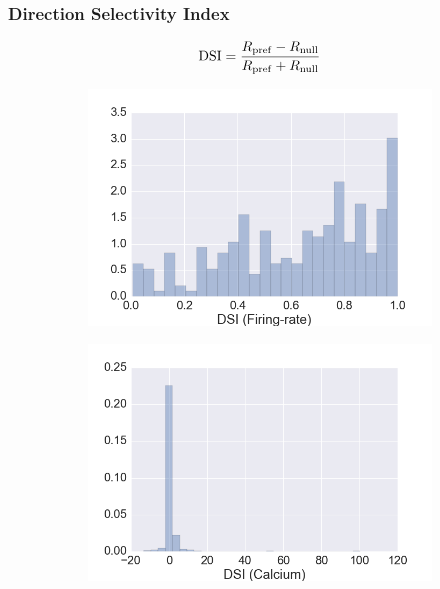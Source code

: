 \documentclass[10pt,mathserif]{beamer}
\begin{document}
\begin{frame}
\frametitle{\bf Direction Selectivity Index}
\begin{gather*}
{\rm DSI} = \frac{R_{\rm pref} - R_{\rm null}}{R_{\rm pref} + R_{\rm null}}
\end{gather*}
\begin{figure}
 \begin{subfigure}{0.45\textwidth}
\centering    
\includegraphics[scale=0.25]{DSI(Firing_rate).png}
 \end{subfigure}
 \begin{subfigure}{0.45\textwidth}
\centering    
\includegraphics[scale=0.25]{DSI(Calcium).png}
            
 \end{subfigure}

\end{figure}
   \end{frame}
\end{document}
